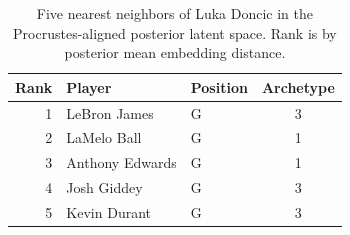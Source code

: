 \begin{table}[htbp]
  \centering\small
  \begin{tabular}{rllc}
    \toprule
    Rank & Player & Position & Archetype \\
    \midrule
    1 & LeBron James & G & 3 \\
    2 & LaMelo Ball & G & 1 \\
    3 & Anthony Edwards & G & 1 \\
    4 & Josh Giddey & G & 3 \\
    5 & Kevin Durant & G & 3 \\
    \bottomrule
  \end{tabular}
  \caption{Five nearest neighbors of Luka Doncic in the Procrustes-aligned posterior latent space. Rank is by posterior mean embedding distance.}
  \label{tab:Luka_Doncic_neighbors}
\end{table}

